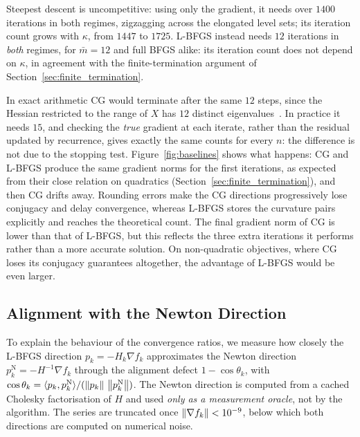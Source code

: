 \noindent Steepest descent is uncompetitive: using only the gradient, it needs
over $1400$ iterations in both regimes, zigzagging across the elongated level
sets; its iteration count grows with $\kappa$, from $1447$ to $1725$. L-BFGS
instead needs $12$ iterations in \emph{both} regimes, for $\bar m = 12$ and
full BFGS alike: its iteration count does not depend on $\kappa$, in
agreement with the finite-termination argument of
Section~\ref{sec:finite_termination}.

\noindent In exact arithmetic CG would terminate after the same $12$ steps,
since the Hessian restricted to the range of $X$ has $12$ distinct
eigenvalues~\cite[Theorem~5.4]{nocedal2006numerical}. In practice it needs
$15$, and checking the \emph{true} gradient at each iterate, rather than the
residual updated by recurrence, gives exactly the same counts for every $n$: the difference is not
due to the stopping test. Figure~\ref{fig:baselines} shows what happens: CG
and L-BFGS produce the same gradient norms for the first iterations, as
expected from their close relation on quadratics
(Section~\ref{sec:finite_termination}), and then CG drifts away. Rounding
errors make the CG directions progressively lose conjugacy and delay
convergence, whereas L-BFGS stores the curvature pairs explicitly and reaches
the theoretical count. The final gradient norm of CG is lower than that of
L-BFGS, but this reflects the three extra iterations it performs rather than
a more accurate solution. On non-quadratic objectives, where CG loses its
conjugacy guarantees altogether, the advantage of L-BFGS would be even
larger.


\subsection{Alignment with the Newton Direction}
\label{sec:exp_newton}

\noindent To explain the behaviour of the convergence ratios, we measure how
closely the L-BFGS direction $p_k = -H_k\nabla f_k$ approximates the Newton
direction $p_k^{\mathrm{N}} = -H^{-1}\nabla f_k$ through the alignment defect
$1 - \cos\theta_k$, with
$\cos\theta_k = \langle p_k, p_k^{\mathrm{N}}\rangle /
(\left\|p_k\right\|\,\left\|p_k^{\mathrm{N}}\right\|)$. The Newton direction is computed from
a cached Cholesky factorisation of $H$ and used \emph{only as a measurement
oracle}, not by the algorithm. The series are truncated once
$\left\|\nabla f_k\right\| < 10^{-9}$, below which both directions are computed on
numerical noise.

